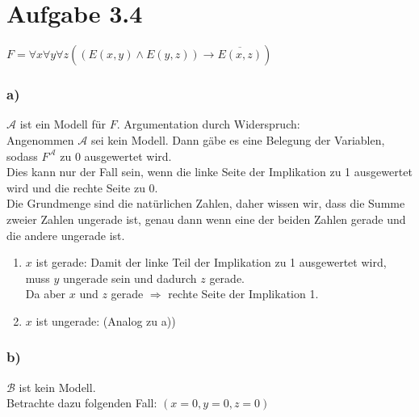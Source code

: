 \documentclass[a4paper,12pt]{article}
\begin{document}
	
	\section*{Aufgabe 3.4}
	\begin{center}
		$F = \forall x \forall y \forall z \left(\left(E\left(x,y\right) \wedge E\left(y,z\right)\right) \rightarrow \overline{E\left(x,z\right)}\right)$
	\end{center}
	\subsubsection*{a)}
	$\mathcal{A}$ ist ein Modell für $F$. Argumentation durch Widerspruch:\\
	
	Angenommen $\mathcal{A}$ sei kein Modell. Dann gäbe es eine Belegung der Variablen, sodass $F^{\mathcal{A}}$ zu 0 ausgewertet wird.\\
	Dies kann nur der Fall sein, wenn die linke Seite der Implikation zu 1 ausgewertet wird und die rechte Seite zu 0.\\
	Die Grundmenge sind die natürlichen Zahlen, daher wissen wir, dass die Summe zweier Zahlen ungerade ist, genau dann wenn eine der beiden Zahlen gerade und die andere ungerade ist.
	\begin{enumerate}[1.]
		\item $x$ ist gerade: Damit der linke Teil der Implikation zu 1 ausgewertet wird, muss $y$ ungerade sein und dadurch $z$ gerade.\\
		Da aber $x$ und $z$ gerade $\Rightarrow$ rechte Seite der Implikation 1.
		\item $x$ ist ungerade: (Analog zu a)) 
	\end{enumerate}

	\subsubsection*{b)}
	$\mathcal{B}$ ist kein Modell.\\
	
	Betrachte dazu folgenden Fall: $\left(x=0, y=0, z=0\right)$
	
\end{document}

